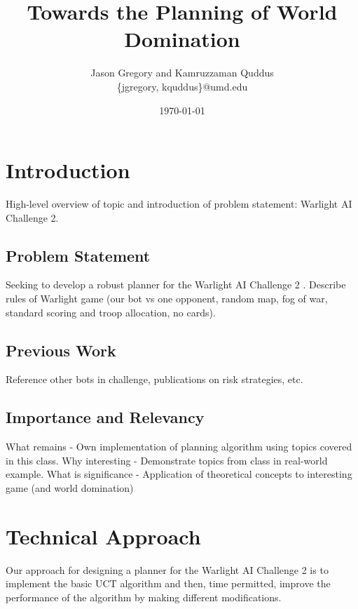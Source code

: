\documentclass[a4paper,11pt]{article}
\begin{document}
\title{Towards the Planning of World Domination}
\author{Jason Gregory and Kamruzzaman Quddus \\ \{jgregory, kquddus\}@umd.edu}
\date{\today}

\maketitle

%

\section{Introduction}\label{sec:intro}
High-level overview of topic and introduction of problem statement: Warlight AI Challenge 2.

\subsection{Problem Statement}\label{sec:problem}
Seeking to develop a robust planner for the Warlight AI Challenge 2 \cite{warlight}.
Describe rules of Warlight game (our bot vs one opponent, random map, fog of war, standard scoring and troop allocation, no cards).

\subsection{Previous Work}\label{sec:previous}
Reference other bots in challenge, publications on risk strategies, etc.

\subsection{Importance and Relevancy}\label{sec:importance}
What remains - Own implementation of planning algorithm using topics covered in this class.
Why interesting - Demonstrate topics from class in real-world example.
What is significance - Application of theoretical concepts to interesting game (and world domination)

%
\section{Technical Approach}\label{sec:approach}
Our approach for designing a planner for the Warlight AI Challenge 2 is to implement the basic UCT algorithm and then, time permitted, improve the performance of the algorithm by making different modifications.
\end{document}
